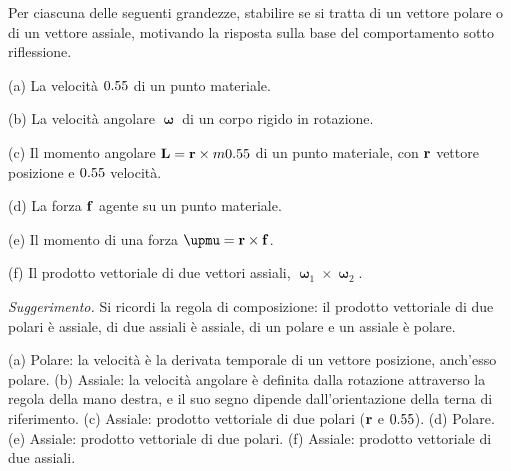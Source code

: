 \begin{esercizio}
	\label{ex:A03_polari_assiali}
	
	Per ciascuna delle seguenti grandezze, stabilire se si tratta di un vettore polare o di un vettore assiale, motivando la risposta sulla base del comportamento sotto riflessione.
	
	(a) La velocità $0.55$ di un punto materiale.
	
	(b) La velocità angolare $\bm{\upomega}$ di un corpo rigido in rotazione.
	
	(c) Il momento angolare $\mathbf{L} = \mathbf{r} \times m0.55$ di un punto materiale, con $\mathbf{r}$ vettore posizione e $0.55$ velocità.
	
	(d) La forza $\mathbf{f}$ agente su un punto materiale.
	
	(e) Il momento di una forza $\bm{\upmu} = \rb \times \fb$.
	
	(f) Il prodotto vettoriale di due vettori assiali, $\bm{\upomega}_1 \times \bm{\upomega}_2$.
	
	\textit{Suggerimento.} Si ricordi la regola di composizione: il prodotto vettoriale di due polari è assiale, di due assiali è assiale, di un polare e un assiale è polare.
	
	\risultato (a) Polare: la velocità è la derivata temporale di un vettore posizione, anch'esso polare. (b) Assiale: la velocità angolare è definita dalla rotazione attraverso la regola della mano destra, e il suo segno dipende dall'orientazione della terna di riferimento. (c) Assiale: prodotto vettoriale di due polari ($\mathbf{r}$ e $0.55$). (d) Polare. (e) Assiale: prodotto vettoriale di due polari. (f) Assiale: prodotto vettoriale di due assiali.
	
\end{esercizio}

